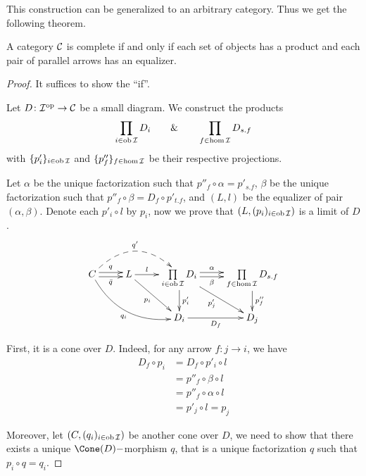   This construction can be generalized to an arbitrary category. Thus we get the following theorem.
  \begin{thm}\label{thm:complete_category}
    A category ${\cal C}$ is complete if and only if each set of objects has a product and each pair of parallel arrows has an equalizer.
  \end{thm}
  \begin{proof}
    It suffices to show the ``if''.

    Let $D\colon{\cal I}^{\operatorname{op}}\to{\cal C}$ be a small diagram. We construct the products
    \begin{equation*}
      \prod_{i\in\operatorname{ob}{\cal I}}D_i\qquad\&\qquad\prod_{f\in\hom{\cal I}}D_{s.f}
    \end{equation*}
    with $\{p'_i\}_{i\in\operatorname{ob}{\cal I}}$ and $\{p''_f\}_{f\in\hom{\cal I}}$ be their respective projections.

    Let $\alpha$ be the unique factorization such that $p''_f\circ\alpha = p'_{s.f}$, $\beta$ be the unique factorization such that $p''_f\circ\beta = D_f\circ p'_{t.f}$, and $(L,l)$ be the equalizer of pair $(\alpha,\beta)$. Denote each $p'_i\circ l$ by $p_i$, now we prove that $(L,(p_i)_{i\in\operatorname{ob}{\cal I}})$ is a limit of $D$.
    \begin{displaymath}
    \xymatrix{
    C\ar@<0.5ex>[r]^{q}\ar@<-0.5ex>[r]_{\bar{q}}\ar@/_1.5pc/[drr]_-{q_i}\ar@{-->}@/^2pc/[rr]^-{q'}&
    L\ar[r]^-{l}\ar[dr]_-{p_i}&
    \prod\limits_{i\in\ob\Ii} D_i\ar@<0.5ex>[r]^-{\alpha}\ar@<-0.5ex>[r]_-{\beta}\ar[d]^-{p'_i}\ar[dr]_{p'_j}&
    \prod\limits_{f\in\hom\Ii}D_{s.f}\ar[d]^-{p''_f} \\
    &
    &D_i\ar[r]_{D_f}
    &D_j
    }
    \end{displaymath}

    First, it is a cone over $D$. Indeed, for any arrow $f\colon j\to i$, we have
    \begin{align*}
      D_f\circ p_i & = D_f\circ p'_i\circ l \\
                           & = p''_f\circ\beta\circ l \\
                           & = p''_f\circ\alpha\circ l \\
                           & = p'_j\circ l = p_j
    \end{align*}

    Moreover, let $(C,(q_i)_{i\in\operatorname{ob}{\cal I}})$ be another cone over $D$, we need to show that there exists a unique $\Cone(D)-$morphism $q$, that is a unique factorization $q$ such that $p_i\circ q = q_i$.


\end{proof}
